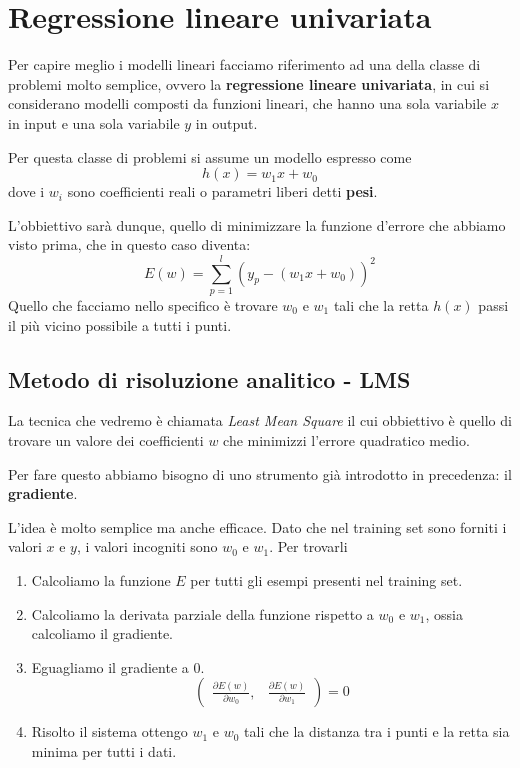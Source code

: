 \section{Regressione lineare univariata}
Per capire meglio i modelli lineari facciamo riferimento ad una della classe di problemi molto semplice, ovvero
la \textbf{regressione lineare univariata}, in cui si considerano modelli composti da funzioni lineari, che hanno una
sola variabile $x$ in input e una sola variabile $y$ in output.

Per questa classe di problemi si assume un modello espresso come
\[ h(x) = w_1 x + w_0 \]
dove i $w_i$ sono coefficienti reali o parametri liberi detti \textbf{pesi}.

L'obbiettivo sar\`a dunque, quello di minimizzare la funzione d'errore che abbiamo visto prima, che in questo caso diventa:
\[ E(w) = \sum_{p=1}^l (y_p - (w_1 x + w_0))^2 \]
Quello che facciamo nello
specifico \`e trovare $w_0$ e $w_1$ tali che la retta $h(x)$ passi il pi\`u vicino possibile a tutti i punti.

\subsection{Metodo di risoluzione analitico - LMS}
La tecnica che vedremo \`e chiamata \emph{Least Mean Square} il cui obbiettivo \`e quello di trovare un valore dei
coefficienti $w$ che minimizzi l'errore quadratico medio.

Per fare questo abbiamo bisogno di uno strumento gi\`a introdotto in precedenza: il \textbf{gradiente}.

L'idea \`e molto semplice ma anche efficace. Dato che nel training set sono forniti i valori $x$ e $y$, i valori incogniti
sono $w_0$ e $w_1$. Per trovarli
\begin{enumerate}
	\item Calcoliamo la funzione $E$ per tutti gli esempi presenti nel training set.
	\item Calcoliamo la derivata parziale della funzione rispetto a $w_0$ e $w_1$, ossia calcoliamo il gradiente.
	\item Eguagliamo il gradiente a 0.
	      \[
		      \begin{pmatrix}
			      \displaystyle\frac{ \partial E(w) }{ \partial w_0 }, &
			      \displaystyle\frac{ \partial E(w) }{ \partial w_1 }
		      \end{pmatrix} = 0
	      \]
	\item Risolto il sistema ottengo $w_1$ e $w_0$ tali che la distanza tra i punti e la retta sia minima per tutti i dati.
\end{enumerate}

